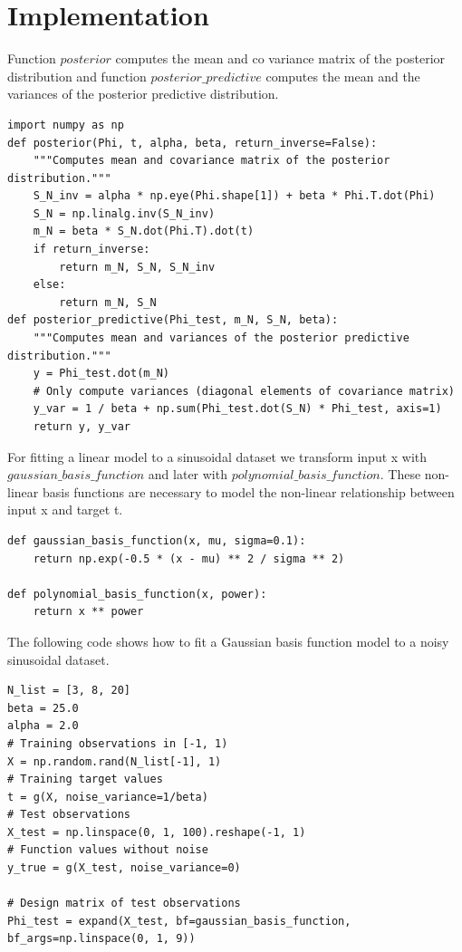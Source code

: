 \documentclass[journal,12pt,twocolumn]{IEEEtran}
\begin{document}
\section{Implementation}
Function $posterior$ computes the mean and co variance matrix of the posterior distribution and function $posterior\_predictive$ computes the mean and the variances of the posterior predictive distribution.
\begin{lstlisting}
import numpy as np
def posterior(Phi, t, alpha, beta, return_inverse=False):
    """Computes mean and covariance matrix of the posterior distribution."""
    S_N_inv = alpha * np.eye(Phi.shape[1]) + beta * Phi.T.dot(Phi)
    S_N = np.linalg.inv(S_N_inv)
    m_N = beta * S_N.dot(Phi.T).dot(t)
    if return_inverse:
        return m_N, S_N, S_N_inv
    else:
        return m_N, S_N
def posterior_predictive(Phi_test, m_N, S_N, beta):
    """Computes mean and variances of the posterior predictive distribution."""
    y = Phi_test.dot(m_N)
    # Only compute variances (diagonal elements of covariance matrix)
    y_var = 1 / beta + np.sum(Phi_test.dot(S_N) * Phi_test, axis=1)
    return y, y_var
\end{lstlisting}
For fitting a linear model to a sinusoidal dataset we transform input x with $gaussian\_basis\_function$ and later with $polynomial\_basis\_function$. 
These non-linear basis functions are necessary to model the non-linear relationship between input x and target t.
\begin{lstlisting}
def gaussian_basis_function(x, mu, sigma=0.1):
    return np.exp(-0.5 * (x - mu) ** 2 / sigma ** 2)
    
def polynomial_basis_function(x, power):
    return x ** power
\end{lstlisting}
The following code shows how to fit a Gaussian basis function model to a noisy sinusoidal dataset.
\begin{lstlisting}
N_list = [3, 8, 20]
beta = 25.0
alpha = 2.0
# Training observations in [-1, 1)
X = np.random.rand(N_list[-1], 1)
# Training target values
t = g(X, noise_variance=1/beta)
# Test observations
X_test = np.linspace(0, 1, 100).reshape(-1, 1)
# Function values without noise 
y_true = g(X_test, noise_variance=0)
    
# Design matrix of test observations
Phi_test = expand(X_test, bf=gaussian_basis_function, bf_args=np.linspace(0, 1, 9))
\end{lstlisting}
\end{document}
